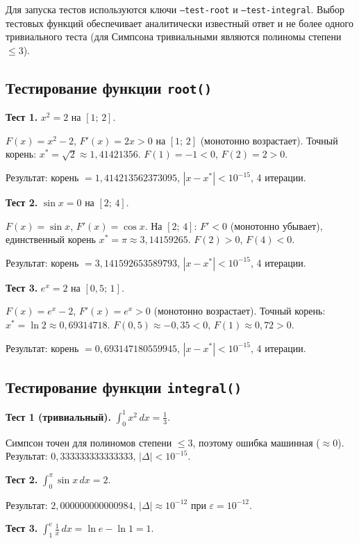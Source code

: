\documentclass[a4paper,12pt,titlepage,finall]{article}
\begin{document}
Для запуска тестов используются ключи \texttt{--test-root} и \texttt{--test-integral}.
Выбор тестовых функций обеспечивает аналитически известный ответ и не более одного
тривиального теста (для Симпсона тривиальными являются полиномы степени $\leq 3$).

\subsection{Тестирование функции \texttt{root()}}

\textbf{Тест 1.} $x^2 = 2$ на $[1;\,2]$.

$F(x) = x^2 - 2$, $F'(x) = 2x > 0$ на $[1;\,2]$ (монотонно возрастает).
Точный корень: $x^* = \sqrt{2} \approx 1{,}41421356$.
$F(1) = -1 < 0$, $F(2) = 2 > 0$.

Результат: корень $= 1{,}414213562373095$, $|x - x^*| < 10^{-15}$, 4 итерации.

\medskip
\textbf{Тест 2.} $\sin x = 0$ на $[2;\,4]$.

$F(x) = \sin x$, $F'(x) = \cos x$.
На $[2;\,4]$: $F' < 0$ (монотонно убывает), единственный корень $x^* = \pi \approx 3{,}14159265$.
$F(2) > 0$, $F(4) < 0$.

Результат: корень $= 3{,}141592653589793$, $|x - x^*| < 10^{-15}$, 4 итерации.

\medskip
\textbf{Тест 3.} $e^x = 2$ на $[0{,}5;\,1]$.

$F(x) = e^x - 2$, $F'(x) = e^x > 0$ (монотонно возрастает).
Точный корень: $x^* = \ln 2 \approx 0{,}69314718$.
$F(0{,}5) \approx -0{,}35 < 0$, $F(1) \approx 0{,}72 > 0$.

Результат: корень $= 0{,}693147180559945$, $|x - x^*| < 10^{-15}$, 4 итерации.

\subsection{Тестирование функции \texttt{integral()}}

\textbf{Тест 1 (тривиальный).} $\displaystyle\int_0^1 x^2\,dx = \frac{1}{3}$.

Симпсон точен для полиномов степени $\leq 3$, поэтому ошибка машинная ($\approx 0$).
Результат: $0{,}333333333333333$, $|\Delta| < 10^{-15}$.

\medskip
\textbf{Тест 2.} $\displaystyle\int_0^{\pi} \sin x\,dx = 2$.

Результат: $2{,}000000000000984$, $|\Delta| \approx 10^{-12}$ при $\varepsilon = 10^{-12}$.

\medskip
\textbf{Тест 3.} $\displaystyle\int_1^{e} \frac{1}{x}\,dx = \ln e - \ln 1 = 1$.
\end{document}

